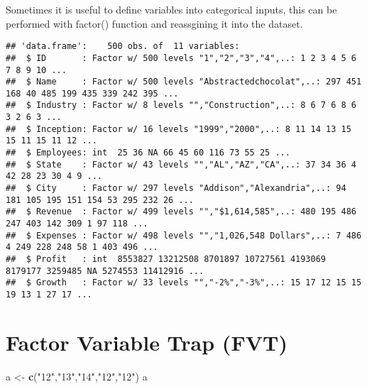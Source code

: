 \documentclass[]{article}
\newenvironment{Shaded}{\begin{snugshade}}{\end{snugshade}}
\newcommand{\CommentTok}[1]{\textcolor[rgb]{0.56,0.35,0.01}{\textit{#1}}}
\newcommand{\KeywordTok}[1]{\textcolor[rgb]{0.13,0.29,0.53}{\textbf{#1}}}
\newcommand{\NormalTok}[1]{#1}
\newcommand{\OperatorTok}[1]{\textcolor[rgb]{0.81,0.36,0.00}{\textbf{#1}}}
\newcommand{\StringTok}[1]{\textcolor[rgb]{0.31,0.60,0.02}{#1}}
\begin{document}
Sometimes it is useful to define variables into categorical inputs, this
can be performed with factor() function and reassgining it into the
dataset.

\begin{Shaded}
\end{Shaded}

\begin{verbatim}
## 'data.frame':    500 obs. of  11 variables:
##  $ ID       : Factor w/ 500 levels "1","2","3","4",..: 1 2 3 4 5 6 7 8 9 10 ...
##  $ Name     : Factor w/ 500 levels "Abstractedchocolat",..: 297 451 168 40 485 199 435 339 242 395 ...
##  $ Industry : Factor w/ 8 levels "","Construction",..: 8 6 7 6 8 6 3 2 6 3 ...
##  $ Inception: Factor w/ 16 levels "1999","2000",..: 8 11 14 13 15 15 11 15 11 12 ...
##  $ Employees: int  25 36 NA 66 45 60 116 73 55 25 ...
##  $ State    : Factor w/ 43 levels "","AL","AZ","CA",..: 37 34 36 4 42 28 23 30 4 9 ...
##  $ City     : Factor w/ 297 levels "Addison","Alexandria",..: 94 181 105 195 151 154 53 295 232 26 ...
##  $ Revenue  : Factor w/ 499 levels "","$1,614,585",..: 480 195 486 247 403 142 309 1 97 118 ...
##  $ Expenses : Factor w/ 498 levels "","1,026,548 Dollars",..: 7 486 4 249 228 248 58 1 403 496 ...
##  $ Profit   : int  8553827 13212508 8701897 10727561 4193069 8179177 3259485 NA 5274553 11412916 ...
##  $ Growth   : Factor w/ 33 levels "","-2%","-3%",..: 15 17 12 15 15 19 13 1 27 17 ...
\end{verbatim}

\hypertarget{factor-variable-trap-fvt}{%
\section{Factor Variable Trap (FVT)}\label{factor-variable-trap-fvt}}

\begin{Shaded}
\begin{Highlighting}[]
\NormalTok{a <-}\StringTok{ }\KeywordTok{c}\NormalTok{(}\StringTok{"12"}\NormalTok{,}\StringTok{"13"}\NormalTok{,}\StringTok{"14"}\NormalTok{,}\StringTok{"12"}\NormalTok{,}\StringTok{"12"}\NormalTok{)}
\NormalTok{a}
\end{Highlighting}
\end{Shaded}
\end{document}

